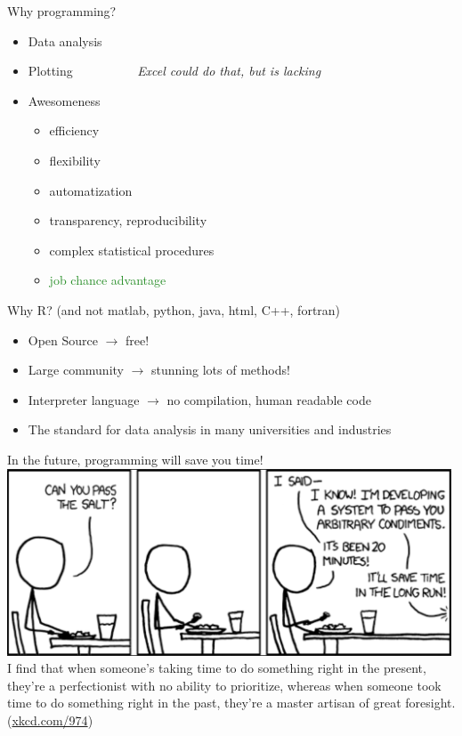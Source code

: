 \documentclass[xcolor=table,           xcolor=dvipsnames]{beamer}\usepackage[]{graphicx}\usepackage[]{color}
\begin{document}
\begin{frame}{Why programming?}
\pause
\begin{itemize}[<+->]
  \item Data analysis
  \item Plotting
  \onslide<+->  \vspace{-0.5em} ~~~~~~~~~ \textit{Excel could do that, but is lacking} \vspace{0.5em}
  \item Awesomeness
    \begin{itemize}
    \item efficiency
    \item flexibility
    \item automatization
    \item transparency, reproducibility
    \item complex statistical procedures
    \item \textcolor{ForestGreen}{job chance advantage}
    \end{itemize}
\end{itemize}
\onslide<+-> Why R? (and not matlab, python, java, html, C++, fortran)
\begin{itemize}[<+->]
  \item Open Source $\rightarrow$ free!
  \item Large community $\rightarrow$ stunning lots of methods!
  \item Interpreter language $\rightarrow$ no compilation, human readable code
  \item The standard for data analysis in many universities and industries
\end{itemize}
\end{frame}


\begin{frame}{In the future, programming will save you time!}
\includegraphics[width=0.99\textwidth]{externalfig/xkcd3.PNG}\\
I find that when someone's taking time to do something right in the present, they're a perfectionist with no ability to prioritize, whereas when someone took time to do something right in the past, they're a master artisan of great foresight. (\href{https://xkcd.com/974/}{xkcd.com/974})\\
\end{frame}
\end{document}
